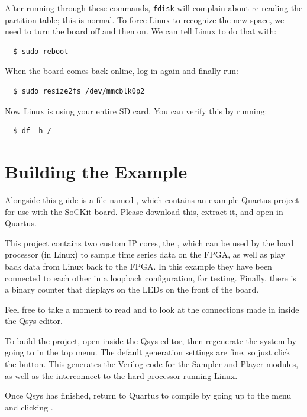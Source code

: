 \documentclass{sockitguide}
\begin{document}
After running through these commands, \texttt{fdisk} will complain
about re-reading the partition table; this is normal. To force Linux
to recognize the new space, we need to turn the board off and then
on. We can tell Linux to do that with:
\begin{verbatim}
  $ sudo reboot
\end{verbatim}

When the board comes back online, log in again and finally run:
\begin{verbatim}
  $ sudo resize2fs /dev/mmcblk0p2
\end{verbatim}

Now Linux is using your entire SD card. You can verify this by running:
\begin{verbatim}
  $ df -h /
\end{verbatim}

\section{Building the Example}

Alongside this guide is a file named , which
contains an example Quartus project for use with the SoCKit
board. Please download this, extract it, and open
 in Quartus.

This project contains two custom IP cores, the , which can be used
by the hard processor (in Linux) to sample time series data on the
FPGA, as well as play back data from Linux back to the FPGA. In this
example they have been connected to each other in a loopback
configuration, for testing. Finally, there is a binary counter that
displays on the LEDs on the front of the board.

Feel free to take a moment to read  and to look
at the connections made in  inside the
Qsys editor.

To build the project, open  inside the Qsys
editor, then regenerate the system by going to  in the top menu. The default generation settings are
fine, so just click the  button. This generates the
Verilog code for the Sampler and Player modules, as well as the
interconnect to the hard processor running Linux.

Once Qsys has finished, return to Quartus to compile by going up to
the menu and clicking .
\end{document}
